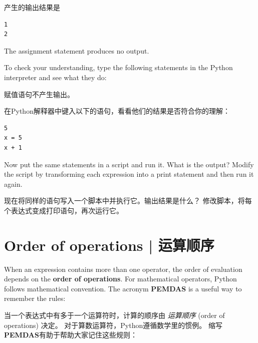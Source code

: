 产生的输出结果是

\begin{lstlisting}
1
2
\end{lstlisting}
%
The assignment statement produces no output.

To check your understanding, type the following statements in the
Python interpreter and see what they do:

赋值语句不产生输出。

在Python解释器中键入以下的语句，看看他们的结果是否符合你的理解：

\begin{lstlisting}
5
x = 5
x + 1
\end{lstlisting}

Now put the same statements in a script and run it.  What
is the output?  Modify the script by transforming each
expression into a print statement and then run it again.

现在将同样的语句写入一个脚本中并执行它。输出结果是什么？ 修改脚本，将每个表达式变成打印语句，再次运行它。

\section{Order of operations  |  运算顺序}
  

When an expression contains more than one operator, the order of
evaluation depends on the {\bf order of operations}.  For
mathematical operators, Python follows mathematical convention.
The acronym {\bf PEMDAS} is a useful way to
remember the rules:

当一个表达式中有多于一个运算符时，计算的顺序由 \emph{运算顺序} (order of operations) 决定。 对于算数运算符，Python遵循数学里的惯例。 缩写\textbf{PEMDAS}有助于帮助大家记住这些规则：

